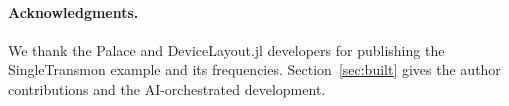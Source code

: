 \documentclass{anvil-paper}
\begin{document}
\paragraph{Acknowledgments.}
We thank the Palace and DeviceLayout.jl developers for publishing the
SingleTransmon example and its frequencies. Section~\ref{sec:built} gives
the author contributions and the AI-orchestrated development.



\end{document}
